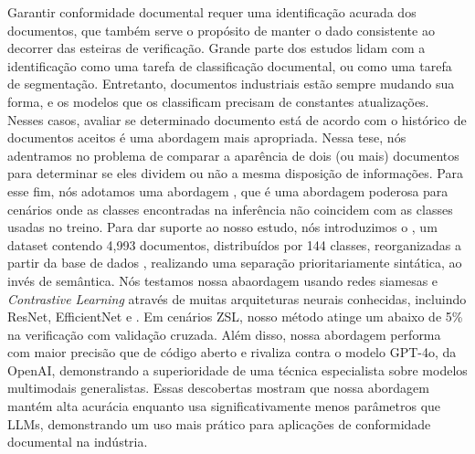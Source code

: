 Garantir conformidade documental requer uma identificação acurada dos documentos, que também serve o propósito de manter o dado consistente ao decorrer das esteiras de verificação. 
Grande parte dos estudos lidam com a identificação como uma tarefa de classificação documental, ou como uma tarefa de segmentação. Entretanto, documentos industriais estão sempre mudando sua forma, e os modelos que os classificam precisam de constantes atualizações. Nesses casos, avaliar se determinado documento está de acordo com o histórico de documentos aceitos é uma abordagem mais apropriada.
Nessa tese, nós adentramos no problema de comparar a aparência de dois (ou mais) documentos para determinar se eles dividem ou não a mesma disposição de informações. Para esse fim, nós adotamos uma abordagem , que é uma abordagem poderosa para cenários onde as classes encontradas na inferência não coincidem com as classes usadas no treino. Para dar suporte ao nosso estudo, nós introduzimos o , um dataset contendo 4,993 documentos, distribuídos por 144 classes, reorganizadas a partir da base de dados , realizando uma separação prioritariamente sintática, ao invés de semântica. Nós testamos nossa abaordagem usando redes siamesas e \textit{Contrastive Learning} através de muitas arquiteturas neurais conhecidas, incluindo ResNet, EfficientNet e . Em cenários \acrshort{ZSL}, nosso método atinge um  abaixo de 5\% na verificação com validação cruzada. Além disso, nossa abordagem  performa com maior precisão que  de código aberto e rivaliza contra o modelo GPT-4o, da OpenAI, demonstrando a superioridade de uma técnica especialista sobre modelos multimodais generalistas. Essas descobertas mostram que nossa abordagem mantém alta acurácia enquanto usa significativamente menos parâmetros que \acrshort{LLM}s, demonstrando um uso mais prático para aplicações de conformidade documental na indústria.
